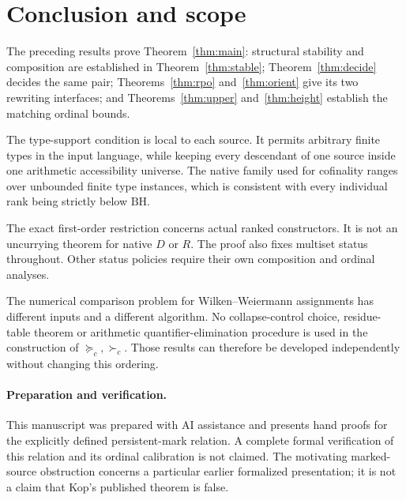 \documentclass[11pt,a4paper]{article}
\theoremstyle{definition}
\newcommand{\BH}{\mathrm{BH}}
\newcommand{\cw}{\succeq_c}
\newcommand{\cs}{\succ_c}
\begin{document}





\section{Conclusion and scope}
The preceding results prove Theorem~\ref{thm:main}: structural stability
and composition are established in Theorem~\ref{thm:stable};
Theorem~\ref{thm:decide} decides the same pair;
Theorems~\ref{thm:rpo} and~\ref{thm:orient} give its two rewriting
interfaces; and Theorems~\ref{thm:upper} and~\ref{thm:height} establish
the matching ordinal bounds.

The type-support condition is local to each source. It permits arbitrary
finite types in the input language, while keeping every descendant of one
source inside one arithmetic accessibility universe. The native family
used for cofinality ranges over unbounded finite type instances, which is
consistent with every individual rank being strictly below $\BH$.

The exact first-order restriction concerns actual ranked constructors.
It is not an uncurrying theorem for native $D$ or $R$. The proof also fixes
multiset status throughout. Other status policies require their own
composition and ordinal analyses.

The numerical comparison problem for Wilken--Weiermann assignments has
different inputs and a different algorithm. No collapse-control choice,
residue-table theorem or arithmetic quantifier-elimination procedure is
used in the construction of $\cw,\cs$. Those results can therefore be
developed independently without changing this ordering.

\paragraph{Preparation and verification.}
This manuscript was prepared with AI assistance and presents hand proofs
for the explicitly defined persistent-mark relation. A complete formal
verification of this relation and its ordinal calibration is not claimed.
The motivating marked-source obstruction concerns a particular earlier
formalized presentation; it is not a claim that Kop's published theorem
is false.

\appendix



\end{document}
